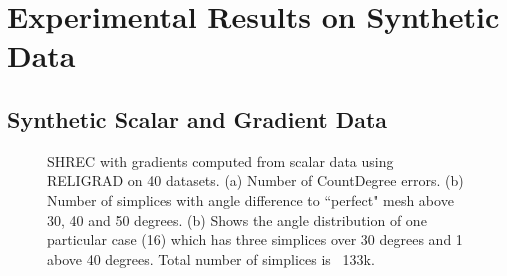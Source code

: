 
\section{Experimental Results on Synthetic Data}\label{sec:synData}
\subsection{Synthetic Scalar and Gradient Data} 
\begin{figure}[tb]
	\caption{SHREC with gradients computed from scalar data using RELIGRAD on 40 datasets. (a) Number of CountDegree errors. (b) Number of simplices with angle difference to ``perfect" mesh above 30, 40 and 50 degrees. (b) Shows the angle distribution of one particular case (16) which has three simplices over 30 degrees and 1 above 40 degrees. Total number of simplices is ~133k.}\label{fig:flangeAngle}
\end{figure}
